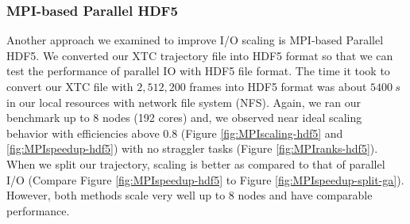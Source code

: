 \subsubsection{MPI-based Parallel HDF5}
\label{HDF5}
Another approach we examined to improve I/O scaling is MPI-based Parallel HDF5. 
We converted our XTC trajectory file into HDF5 format so that we can test the performance of parallel IO with HDF5 file format.
The time it took to convert our XTC file with $2,512,200$ frames into HDF5 format was about $5400~s$ in our local resources with network file system (NFS).
Again, we ran our benchmark up to 8 nodes (192 cores) and, we observed near ideal scaling behavior with efficiencies above 0.8 (Figure \ref{fig:MPIscaling-hdf5} and \ref{fig:MPIspeedup-hdf5}) with no straggler tasks (Figure \ref{fig:MPIranks-hdf5}).  
When we split our trajectory, scaling is better as compared to that of parallel I/O (Compare Figure \ref{fig:MPIspeedup-hdf5} to Figure \ref{fig:MPIspeedup-split-ga}). 
However, both methods scale very well up to 8 nodes and have comparable performance.  

